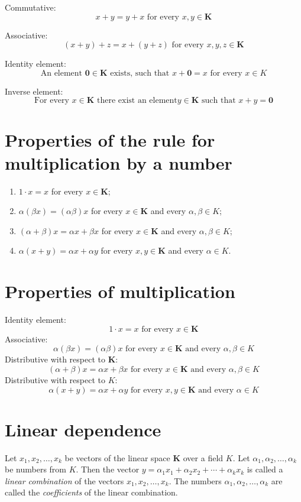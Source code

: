 \documentclass[11pt]{article}
\begin{document}
Commutative:
$$x+y=y+x\text{ for every }x,y\in \mathbf{K}$$

Associative:
$$(x+y)+z=x+(y+z)\text{ for every }x,y,z \in \mathbf{K}$$

Identity element:
$$\text{An element }\mathbf{0}\in\mathbf{K}\text{ exists, such
that }x+\mathbf{0}=x\text{ for every }x\in K$$

Inverse element:
$$\text{For every }x\in\mathbf{K}\text{ there exist an element
}y\in\mathbf{K}\text{ such that }x+y=\mathbf{0}$$
\section*{Properties of the rule for multiplication by a number}
\label{sec:org804fbc8}
\begin{enumerate}
\item \(1\cdot x=x\) for every \(x\in\mathbf{K}\);
\item \(\alpha(\beta x)=(\alpha \beta)x\) for every \(x\in\mathbf{K}\) and
every \(\alpha,\beta \in K\);
\item \((\alpha+\beta)x = \alpha x + \beta x\) for every \(x\in\mathbf{K}\)
and every \(\alpha,\beta \in K\);
\item \(\alpha(x+y)=\alpha x+\alpha y\) for every \(x,y \in \mathbf{K}\) and
every \(\alpha \in K\).
\end{enumerate}
\section*{Properties of multiplication}
\label{sec:org5907f68}

Identity element:
$$ 1 \cdot x = x\text{ for every } x\in\mathbf{K}$$
Associative: 
$$ \alpha(\beta x)=(\alpha \beta) x \text{ for every } x\in\mathbf{K}
\text{ and every } \alpha,\beta\in K$$
Distributive with respect to \(\mathbf{K}\):
$$(\alpha+\beta)x=\alpha x + \beta x \text{ for every } x\in\mathbf{K}
\text{ and every } \alpha,\beta\in K$$
Distributive with respect to \(K\):
$$\alpha(x+y)=\alpha x+\alpha y \text{ for every } x,y \in\mathbf{K}
\text{ and every } \alpha \in K$$

\section*{Linear dependence}
\label{sec:org7b98bc4}
Let \(x_1,x_2,\ldots, x_k\) be vectors of the linear space \(\mathbf{K}\)
over a field \(K\).
Let \(\alpha_1,\alpha_2,\ldots, \alpha_k\) be numbers from \(K\).
Then the vector \(\boxed{y=\alpha_1 x_1 + \alpha_2 x_2 +\cdots +
\alpha_k x_k}\) is called a \emph{linear combination} of the vectors \(x_1,
x_2, \ldots , x_k\).
The numbers \(\alpha_1,\alpha_2,\ldots,\alpha_k\) are called the
\emph{coefficients} of the linear combination.
\end{document}
